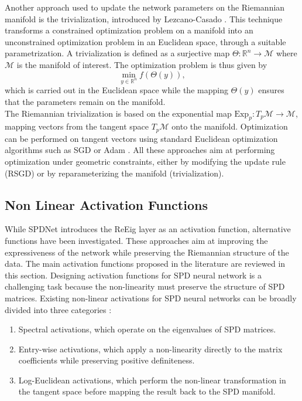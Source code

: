 \documentclass[11pt,a4paper]{article}
\begin{document}
\noindent Another approach used to update the network parameters on the Riemannian manifold is the trivialization, introduced by Lezcano-Casado \cite{triv}.
This technique transforms a constrained optimization problem on a manifold into an unconstrained optimization problem in an Euclidean space, through a suitable parametrization.
A trivialization is defined as a surjective map $\Theta : \mathbb{R}^n \rightarrow \mathcal{M}$ where $\mathcal{M}$ is the manifold of interest. The optimization problem is thus given by \[ \min_{y \in \mathbb{R}^n} f(\Theta(y)),\] which is carried out in the Euclidean space while the mapping $\Theta(y)$ ensures that the parameters remain on the manifold. \\
The Riemannian trivialization is based on the exponential map $ \mathrm{Exp}_p : T_p\mathcal{M} \rightarrow \mathcal{M}$, mapping vectors from the tangent space $T_p\mathcal{M}$ onto the manifold.
Optimization can be performed on tangent vectors using standard Euclidean optimization algorithms such as SGD or Adam \cite{Adam}. All these approaches aim at performing optimization under geometric constraints, either by modifying the update rule (RSGD) or by reparameterizing the manifold (trivialization). 


\subsection{Non Linear Activation Functions}
\label{sec:act}
While SPDNet introduces the ReEig layer as an activation function, alternative functions have been investigated. These approaches aim at improving the expressiveness of the network while preserving the Riemannian structure of the data. The main activation functions proposed in the literature are reviewed in this section.
Designing activation functions for SPD neural network is a challenging task because the non-linearity must preserve the structure of SPD matrices.  
Existing non-linear activations for SPD neural networks can be broadly divided into three categories :
\begin{enumerate}
    \item Spectral activations, which operate on the eigenvalues of SPD matrices.
    \item Entry-wise activations, which apply a non-linearity directly to the matrix coefficients while preserving positive definiteness.
    \item Log-Euclidean activations, which perform the non-linear transformation in the tangent space before mapping the result back to the SPD manifold.
\end{enumerate} 
\end{document}

